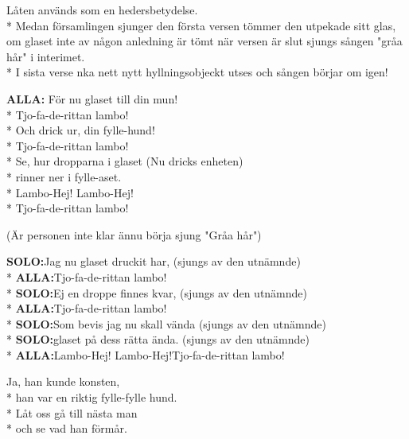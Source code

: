 \begin{SongText}[Lambo]
    \begin{SongInfo}
        Låten används som en hedersbetydelse.\\*%
        Medan församlingen sjunger den första versen tömmer den utpekade sitt glas, om glaset inte av någon anledning är tömt när versen är slut sjungs sången "gråa hår" i interimet.\\*%
        I sista verse nka nett nytt hyllningsobjeckt utses och sången börjar om igen!
    \end{SongInfo}
    \begin{SongVerse}
        \textbf{ALLA:} För nu glaset till din mun!\\*%
        Tjo-fa-de-rittan lambo!\\*%
        Och drick ur, din fylle-hund!\\*%
        Tjo-fa-de-rittan lambo!\\*%
        Se, hur dropparna i glaset (Nu dricks enheten)\\*%
        rinner ner i fylle-aset.\\*%
        Lambo-Hej! Lambo-Hej!\\*%
        Tjo-fa-de-rittan lambo!
    \end{SongVerse}
    \begin{SongVerse}
        (Är personen inte klar ännu börja sjung "Gråa hår")
    \end{SongVerse}
    \begin{SongVerse}
        \textbf{SOLO:}Jag nu glaset druckit har, (sjungs av den utnämnde)\\*%
        \textbf{ALLA:}Tjo-fa-de-rittan lambo!\\*%
        \textbf{SOLO:}Ej en droppe finnes kvar, (sjungs av den utnämnde)\\*%
        \textbf{ALLA:}Tjo-fa-de-rittan lambo!\\*%
        \textbf{SOLO:}Som bevis jag nu skall vända (sjungs av den utnämnde)\\*%
        \textbf{SOLO:}glaset på dess rätta ända. (sjungs av den utnämnde)\\*%
        \textbf{ALLA:}Lambo-Hej! Lambo-Hej!Tjo-fa-de-rittan lambo!
    \end{SongVerse}
    \begin{SongVerse}
        Ja, han kunde konsten,\\*%
        han var en riktig fylle-fylle hund.\\*%
        Låt oss gå till nästa man\\*%
        och se vad han förmår.
    \end{SongVerse}
\end{SongText}
